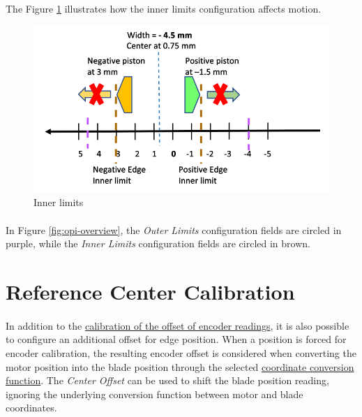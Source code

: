\documentclass[openany]{article}
\begin{document}
    \paragraph{} The Figure \ref{fig:inner-limits} illustrates how the inner limits configuration affects motion.

    \begin{figure}[!h]
        \caption{Inner limits}
        \label{fig:inner-limits}
        \centering
        \includegraphics[width=1.0\textwidth]{diff_ctrl_inner_limits}
    \end{figure}
    \FloatBarrier

    \paragraph{} In Figure \ref{fig:opi-overview}, the \emph{Outer Limits} configuration fields are circled in purple, while the \emph{Inner Limits} configuration fields are circled in brown.

\section{Reference Center Calibration}\label{sec:ref-center-cal}

    \paragraph{} In addition to the \hyperref[sec:edge-pos-cal]{calibration of the offset of encoder readings}, it is also possible to configure an additional offset for edge position. When a position is forced for encoder calibration, the resulting encoder offset is considered when converting the motor position into the blade position through the selected \hyperref[sec:ref-frame-conv]{coordinate conversion function}. The \emph{Center Offset} can be used to shift the blade position reading, ignoring the underlying conversion function between motor and blade coordinates.
\end{document}
